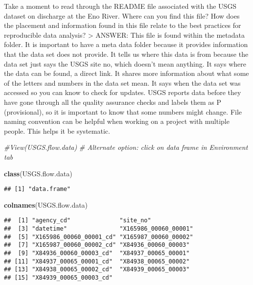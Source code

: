 \documentclass[]{article}
\newenvironment{Shaded}{\begin{snugshade}}{\end{snugshade}}
\newcommand{\CommentTok}[1]{\textcolor[rgb]{0.56,0.35,0.01}{\textit{#1}}}
\newcommand{\KeywordTok}[1]{\textcolor[rgb]{0.13,0.29,0.53}{\textbf{#1}}}
\newcommand{\NormalTok}[1]{#1}
\begin{document}
Take a moment to read through the README file associated with the USGS
dataset on discharge at the Eno River. Where can you find this file? How
does the placement and information found in this file relate to the best
practices for reproducible data analysis? \textgreater{} ANSWER: This
file is found within the metadata folder. It is important to have a meta
data folder because it provides information that the data set does not
provide. It tells us where this data is from because the data set just
says the USGS site no, which doesn't mean anything. It says where the
data can be found, a direct link. It shares more information about what
some of the letters and numbers in the data set mean. It says when the
data set was accessed so you can know to check for updates. USGS reports
data before they have gone through all the quality assurance checks and
labels them as P (provisional), so it is important to know that some
numbers might change. File naming convention can be helpful when working
on a project with multiple people. This helps it be systematic.

\begin{Shaded}
\begin{Highlighting}[]
\CommentTok{#View(USGS.flow.data)}
\CommentTok{# Alternate option: click on data frame in Environment tab}

\KeywordTok{class}\NormalTok{(USGS.flow.data)}
\end{Highlighting}
\end{Shaded}

\begin{verbatim}
## [1] "data.frame"
\end{verbatim}

\begin{Shaded}
\begin{Highlighting}[]
\KeywordTok{colnames}\NormalTok{(USGS.flow.data)}
\end{Highlighting}
\end{Shaded}

\begin{verbatim}
##  [1] "agency_cd"              "site_no"               
##  [3] "datetime"               "X165986_00060_00001"   
##  [5] "X165986_00060_00001_cd" "X165987_00060_00002"   
##  [7] "X165987_00060_00002_cd" "X84936_00060_00003"    
##  [9] "X84936_00060_00003_cd"  "X84937_00065_00001"    
## [11] "X84937_00065_00001_cd"  "X84938_00065_00002"    
## [13] "X84938_00065_00002_cd"  "X84939_00065_00003"    
## [15] "X84939_00065_00003_cd"
\end{verbatim}
\end{document}
